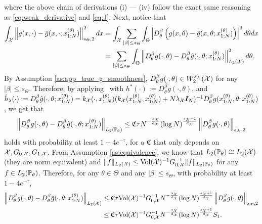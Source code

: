 where the above chain of derivations (i) --- (iv) follow the exact same reasoning as \eqref{eq:weak_derivative} and \eqref{eq:J}. Next, notice that
\begin{align}\label{eq:g_g_hat_sobolev}
    \int_{\mathcal{X}} \left\| g(x, \cdot) - \hat{g}(x, \cdot; x_{1:N}^{(\theta)}) \right\|_{s_\Theta, 2}^2 dx &= \int_{\mathcal{X}} \sum_{ | \beta| \leq s_\Theta } \int_\Theta \left| D_\theta^\beta \left( g(x, \theta) - \hat{g}(x, \theta; x_{1:N}^{(\theta)}) \right) \right|^2 d \theta dx \nonumber \\
    &= \sum_{ | \beta| \leq s_\Theta } \int_\Theta \left\| D_\theta^\beta  g(\cdot, \theta) - D_\theta^\beta \hat{g}(\cdot, \theta; x_{1:N}^{(\theta)}) \right\|_{L_2(\mathcal{X})}^2 d\theta .
\end{align}
% 
By Assumption \ref{as:app_true_g_smoothness}, $D_\theta^\beta  g(\cdot, \theta) \in W_2^{s_{\mathcal{X}}}(\mathcal{X})$ for any $|\beta| \leq s_\Theta$. Therefore, by applying~ with $h^\ast(\cdot):= D_\theta^\beta g(\cdot, \theta)$, and $\hat{h}_{\lambda}(\cdot) := D_\theta^\beta \hat{g}(\cdot, \theta; x_{1:N}^{(\theta)}) = k_{\mathcal{X}}(\cdot, x_{1:N}^{(\theta)}) (k_{\mathcal{X}}(x_{1:N}^{(\theta)}, x_{1:N}^{(\theta)}) + N \lambda_{\mathcal{X}} \boldsymbol{I}_N)^{-1} D_\theta^\beta g(x_{1:N}^{(\theta)}, \theta; x_{1:N}^{(\theta)})$, we get that
\begin{align}\label{eq:D_g_D_g_hat}
    \left\| D_\theta^\beta  g(\cdot, \theta) - D_\theta^\beta \hat{g}(\cdot, \theta; x_{1:N}^{(\theta)}) \right\|_{L_2(\mathbb{P}_\theta)} \leq \mathfrak{C} \tau N^{-\frac{s_{\mathcal{X}}}{d_{\mathcal{X}}}} (\log N)^{\frac{s_{\mathcal{X}}+1}{d_{\mathcal{X}}}} \left\| D_\theta^\beta g(\cdot, \theta) \right \|_{s_{\mathcal{X}},2}
\end{align}
holds with probability at least $ 1 - 4e^{-\tau}$, for a $\mathfrak{C}$ that only depends on $\mathcal{X}, G_{0, \mathcal{X}}, G_{1, \mathcal{X}}$. 
From Assumption 
\ref{as:equivalence}, we know that $L_2(\mathbb{P}_\theta) \cong L_2(\mathcal{X})$ (they are norm equivalent) and $\|f\|_{L_2(\mathcal{X})} \leq \text{Vol}(\mathcal{X})^{-1} G_{0, \mathcal{X}}^{-1} \|f\|_{L_2(\mathbb{P}_\theta)}$ for any $f \in L_2(\mathbb{P}_\theta)$. 
Therefore, for any $\theta \in \Theta$ and any $|\beta| \leq s_\Theta$, with probability at least $ 1 - 4e^{-\tau}$,
\begin{align}\label{eq:D_g_D_g_hat_lebesgue}
    \left\| D_\theta^\beta  g(\cdot, \theta) - D_\theta^\beta \hat{g}(\cdot, \theta; x_{1:N}^{(\theta)}) \right\|_{L_2(\mathcal{X})} &\leq \mathfrak{C} \tau \text{Vol}(\mathcal{X})^{-1} G_{0, \mathcal{X}}^{-1} N^{-\frac{s_{\mathcal{X}}}{d_{\mathcal{X}}}}  (\log N)^{\frac{s_{\mathcal{X}}+1}{d_{\mathcal{X}}}} \left\| D_\theta^\beta g(\cdot, \theta) \right \|_{s_{\mathcal{X}},2} \nonumber \\
    &\leq \mathfrak{C} \tau \text{Vol}(\mathcal{X})^{-1} G_{0, \mathcal{X}}^{-1} N^{-\frac{s_{\mathcal{X}}}{d_{\mathcal{X}}}}  (\log N)^{\frac{s_{\mathcal{X}}+1}{d_{\mathcal{X}}}} S_1.
\end{align}
